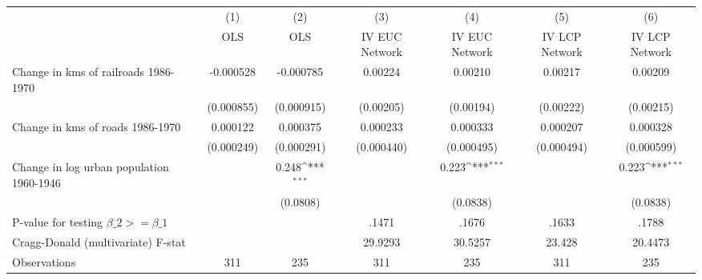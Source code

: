 {
\def\sym#1{\ifmmode^{#1}\else\(^{#1}\)\fi}
\begin{tabular}{l*{6}{c}}
\hline\hline
                &\multicolumn{1}{c}{(1)}&\multicolumn{1}{c}{(2)}&\multicolumn{1}{c}{(3)}&\multicolumn{1}{c}{(4)}&\multicolumn{1}{c}{(5)}&\multicolumn{1}{c}{(6)}\\
                &\multicolumn{1}{c}{OLS}&\multicolumn{1}{c}{OLS}&\multicolumn{1}{c}{IV EUC Network}&\multicolumn{1}{c}{IV EUC Network}&\multicolumn{1}{c}{IV LCP Network}&\multicolumn{1}{c}{IV LCP Network}\\
\hline
Change in kms of railroads 1986-1970&-0.000528         &-0.000785         &  0.00224         &  0.00210         &  0.00217         &  0.00209         \\
                &(0.000855)         &(0.000915)         &(0.00205)         &(0.00194)         &(0.00222)         &(0.00215)         \\
[1em]
Change in kms of roads 1986-1970& 0.000122         & 0.000375         & 0.000233         & 0.000333         & 0.000207         & 0.000328         \\
                &(0.000249)         &(0.000291)         &(0.000440)         &(0.000495)         &(0.000494)         &(0.000599)         \\
[1em]
Change in log urban population 1960-1946&                  &    0.248\sym{***}&                  &    0.223\sym{***}&                  &    0.223\sym{***}\\
                &                  & (0.0808)         &                  & (0.0838)         &                  & (0.0838)         \\
\hline
P-value for testing $\beta\_{2} >= \beta\_{1}$&                  &                  &    .1471         &    .1676         &    .1633         &    .1788         \\
Cragg-Donald (multivariate) F-stat&                  &                  &  29.9293         &  30.5257         &   23.428         &  20.4473         \\
Observations    &      311         &      235         &      311         &      235         &      311         &      235         \\
\hline\hline
\end{tabular}
}
